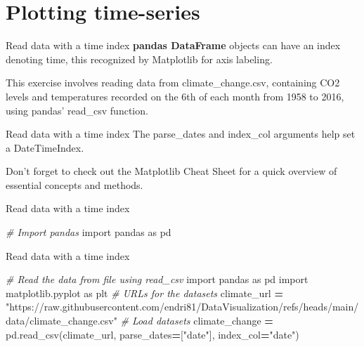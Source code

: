 \documentclass[
  ignorenonframetext,
]{beamer}
\newenvironment{Shaded}{\begin{snugshade}}{\end{snugshade}}
\newcommand{\CommentTok}[1]{\textcolor[rgb]{0.56,0.35,0.01}{\textit{#1}}}
\newcommand{\ImportTok}[1]{#1}
\newcommand{\NormalTok}[1]{#1}
\newcommand{\OperatorTok}[1]{\textcolor[rgb]{0.81,0.36,0.00}{\textbf{#1}}}
\newcommand{\StringTok}[1]{\textcolor[rgb]{0.31,0.60,0.02}{#1}}
\begin{document}
\section{Plotting time-series}\label{plotting-time-series}

\begin{frame}{Read data with a time index}
\label{read-data-with-a-time-index}
\textbf{pandas DataFrame} objects can have an index denoting time, this
recognized by Matplotlib for axis labeling.

This exercise involves reading data from climate\_change.csv, containing
CO2 levels and temperatures recorded on the 6th of each month from 1958
to 2016, using pandas' read\_csv function.
\end{frame}

\begin{frame}{Read data with a time index}
\label{read-data-with-a-time-index-1}
The parse\_dates and index\_col arguments help set a DateTimeIndex.

Don't forget to check out the Matplotlib Cheat Sheet for a quick
overview of essential concepts and methods.
\end{frame}

\begin{frame}[fragile]{Read data with a time index}
\label{read-data-with-a-time-index-2}

\begin{Shaded}
\begin{Highlighting}[]
\CommentTok{\# Import pandas}
\ImportTok{import}\NormalTok{ pandas }\ImportTok{as}\NormalTok{ pd}
\end{Highlighting}
\end{Shaded}
\end{frame}

\begin{frame}[fragile]{Read data with a time index}
\label{read-data-with-a-time-index-3}

\begin{Shaded}
\begin{Highlighting}[]
\CommentTok{\# Read the data from file using read\_csv}
\ImportTok{import}\NormalTok{ pandas }\ImportTok{as}\NormalTok{ pd}
\ImportTok{import}\NormalTok{ matplotlib.pyplot }\ImportTok{as}\NormalTok{ plt}
\CommentTok{\# URLs for the datasets}
\NormalTok{climate\_url }\OperatorTok{=} \StringTok{"https://raw.githubusercontent.com/endri81/DataVisualization/refs/heads/main/data/climate\_change.csv"}
\CommentTok{\# Load datasets}
\NormalTok{climate\_change }\OperatorTok{=}\NormalTok{ pd.read\_csv(climate\_url, parse\_dates}\OperatorTok{=}\NormalTok{[}\StringTok{"date"}\NormalTok{], index\_col}\OperatorTok{=}\StringTok{"date"}\NormalTok{)}
\end{Highlighting}
\end{Shaded}
\end{frame}
\end{document}
